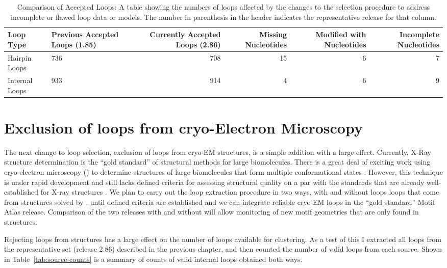 \begin{table}
  \begin{tabulary}{\linewidth}{LLRRRR}
    \toprule
    Loop Type &
      Previous Accepted Loops (1.85) &
      Currently Accepted Loops (2.86) &
      Missing Nucleotides &
      Modified with Nucleotides &
      Incomplete Nucleotides \\
    \midrule
    Hairpin Loops  & 736 & 708 & 15 & 6 & 7 \\
    Internal Loops & 933 & 914 & 4  & 6 & 9 \\
    \bottomrule
  \end{tabulary}
  \caption{Comparison of Accepted Loops: A table showing the numbers of loops
  affected by the changes to the selection procedure to address incomplete or
  flawed loop data or models. The number in parenthesis in the header indicates
  the representative release for that column.}
  \label{tab:loop-quality-changes}
\end{table}

\section{Exclusion of loops from cryo-Electron Microscopy}

The next change to loop selection, exclusion of loops from cryo-EM structures,
is a simple addition with a large effect. Currently, X-Ray structure
determination is the ``gold standard'' of structural methods for large
biomolecules. There is a great deal of exciting work using cryo-electron
microscopy (\cyem) to determine structures of large biomolecules that form
multiple conformational states \cite{Amunts2014, Quade2015, Schureck2016}.
However, this technique is under rapid development and still lacks defined
criteria for assessing structural quality on a par with the standards that are
already well-established for X-ray structures \cite{Henderson2012}. We plan to
carry out the loop extraction procedure in two ways, with and without loops
loops that come from structures solved by \cyem, until defined criteria are
established and we can integrate reliable cryo-EM loops in the ``gold standard''
Motif Atlas release. Comparison of the two releases with and without \cyem{}
will allow monitoring of new motif geometries that are only found in \cyem{}
structures.

Rejecting loops from \cyem{} structures has a large effect on the number of
loops available for clustering. As a test of this I extracted all loops from the
representative set (release 2.86) described in the previous chapter, and then
counted the number of valid loops from each source.  Shown in
Table~\ref{tab:source-counts} is a summary of counts of valid internal loops
obtained both ways.

